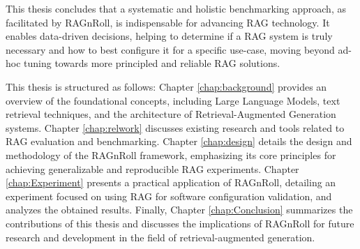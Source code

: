 This thesis concludes that a systematic and holistic benchmarking approach, as facilitated by RAGnRoll, is indispensable for advancing RAG technology. It enables data-driven decisions, helping to determine if a RAG system is truly necessary and how to best configure it for a specific use-case, moving beyond ad-hoc tuning towards more principled and reliable RAG solutions.

This thesis is structured as follows:
Chapter \ref{chap:background} provides an overview of the foundational concepts, including Large Language Models, text retrieval techniques, and the architecture of Retrieval-Augmented Generation systems.
Chapter \ref{chap:relwork} discusses existing research and tools related to RAG evaluation and benchmarking.
Chapter \ref{chap:design} details the design and methodology of the RAGnRoll framework, emphasizing its core principles for achieving generalizable and reproducible RAG experiments.
Chapter \ref{chap:Experiment} presents a practical application of RAGnRoll, detailing an experiment focused on using RAG for software configuration validation, and analyzes the obtained results.
Finally, Chapter \ref{chap:Conclusion} summarizes the contributions of this thesis and discusses the implications of RAGnRoll for future research and development in the field of retrieval-augmented generation.
